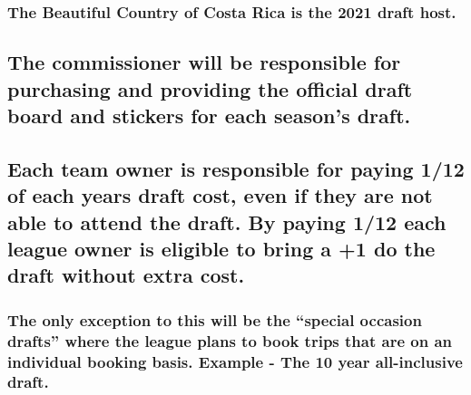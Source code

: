 \documentclass[
]{book}
\begin{document}
\hypertarget{the-beautiful-country-of-costa-rica-is-the-2021-draft-host.}{%
\subsubsection{The Beautiful Country of Costa Rica is the 2021 draft host.}\label{the-beautiful-country-of-costa-rica-is-the-2021-draft-host.}}

\hypertarget{the-commissioner-will-be-responsible-for-purchasing-and-providing-the-official-draft-board-and-stickers-for-each-seasons-draft.}{%
\subsection{The commissioner will be responsible for purchasing and providing the official draft board and stickers for each season's draft.}\label{the-commissioner-will-be-responsible-for-purchasing-and-providing-the-official-draft-board-and-stickers-for-each-seasons-draft.}}

\hypertarget{each-team-owner-is-responsible-for-paying-112-of-each-years-draft-cost-even-if-they-are-not-able-to-attend-the-draft.-by-paying-112-each-league-owner-is-eligible-to-bring-a-1-do-the-draft-without-extra-cost.}{%
\subsection{Each team owner is responsible for paying 1/12 of each years draft cost, even if they are not able to attend the draft. By paying 1/12 each league owner is eligible to bring a +1 do the draft without extra cost.}\label{each-team-owner-is-responsible-for-paying-112-of-each-years-draft-cost-even-if-they-are-not-able-to-attend-the-draft.-by-paying-112-each-league-owner-is-eligible-to-bring-a-1-do-the-draft-without-extra-cost.}}

\hypertarget{the-only-exception-to-this-will-be-the-special-occasion-drafts-where-the-league-plans-to-book-trips-that-are-on-an-individual-booking-basis.-example---the-10-year-all-inclusive-draft.}{%
\subsubsection{The only exception to this will be the ``special occasion drafts'' where the league plans to book trips that are on an individual booking basis. Example - The 10 year all-inclusive draft.}\label{the-only-exception-to-this-will-be-the-special-occasion-drafts-where-the-league-plans-to-book-trips-that-are-on-an-individual-booking-basis.-example---the-10-year-all-inclusive-draft.}}
\end{document}
